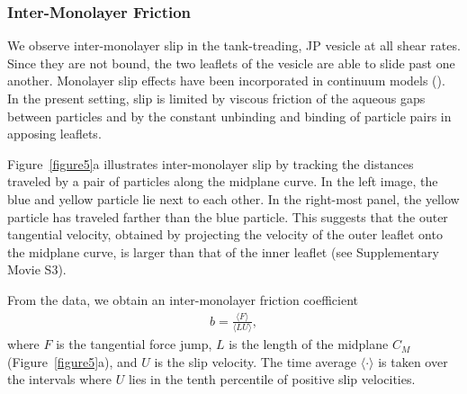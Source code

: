 \documentclass[lineno]{jfm}
\begin{document}
\subsubsection{Inter-Monolayer Friction}
We observe inter-monolayer slip in the tank-treading, JP vesicle at all
shear rates. Since they are not bound, the two leaflets of the vesicle
are able to slide past one another. 
Monolayer slip effects have been incorporated in continuum models (\cite{sch-vla-mik2010}).
In the present setting, slip is limited by viscous
friction of the aqueous gaps between particles and by the constant
unbinding and binding of particle pairs in apposing leaflets. 


Figure~\ref{figure5}a illustrates inter-monolayer slip by tracking the distances
traveled by a pair of particles along the midplane curve. In the left image, the blue and yellow
particle lie next to each other. In the right-most panel, the yellow
particle has traveled farther than the blue particle. This suggests that
the outer tangential velocity, obtained by projecting the velocity of the
outer leaflet onto the midplane curve, 
is larger than that of the inner leaflet 
(see Supplementary Movie S3).

From the data, we obtain an inter-monolayer friction coefficient 
\begin{align}
  b =  \frac{\langle F \rangle}{\langle L   U \rangle} ,
\end{align}
where $F$ is the tangential force jump, $L$ is the length of the
midplane $C_M$ (Figure~\ref{figure5}a), and $U$ is the slip velocity.
The time average $\langle \cdot \rangle$ is taken over the intervals where $U$ lies in the 
tenth percentile of positive slip velocities.


\end{document}
